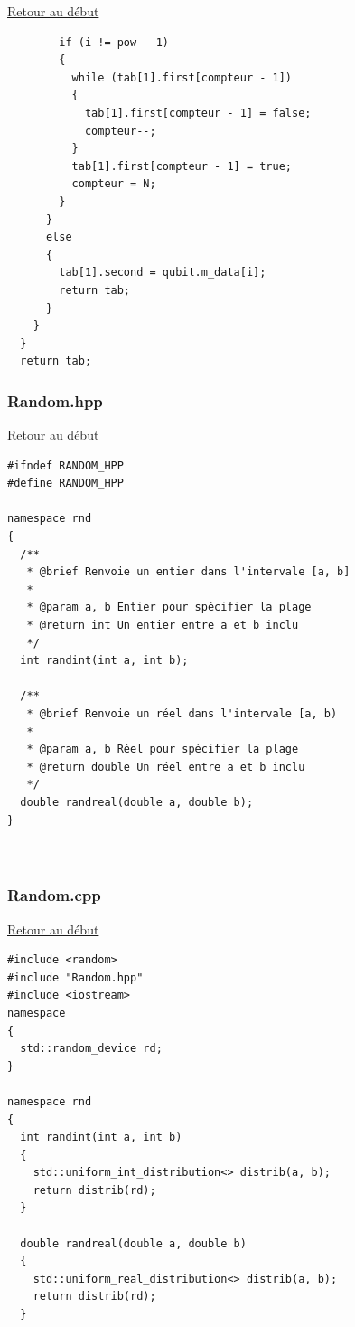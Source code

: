 {\begin{frame}[fragile]
\hyperlink{conclusion}{Retour au début}\newline
\begin{verbatim}
        if (i != pow - 1)
        {
          while (tab[1].first[compteur - 1])
          {
            tab[1].first[compteur - 1] = false;
            compteur--;
          }
          tab[1].first[compteur - 1] = true;
          compteur = N;
        }
      }
      else
      {
        tab[1].second = qubit.m_data[i];
        return tab;
      }
    }
  }
  return tab;

\end{verbatim}
\end{frame}

\begin{frame}[fragile]
\label{Random.hpp}
\frametitle{Random.hpp}
\hyperlink{conclusion}{Retour au début}\newline
\begin{verbatim}
#ifndef RANDOM_HPP
#define RANDOM_HPP

namespace rnd
{
  /**
   * @brief Renvoie un entier dans l'intervale [a, b]
   * 
   * @param a, b Entier pour spécifier la plage
   * @return int Un entier entre a et b inclu
   */
  int randint(int a, int b);

  /**
   * @brief Renvoie un réel dans l'intervale [a, b)
   * 
   * @param a, b Réel pour spécifier la plage
   * @return double Un réel entre a et b inclu
   */
  double randreal(double a, double b);
}



\end{verbatim}
\end{frame}

\begin{frame}[fragile]
\label{Random.cpp}
\frametitle{Random.cpp}
\hyperlink{conclusion}{Retour au début}\newline
\begin{verbatim}
#include <random>
#include "Random.hpp"
#include <iostream>
namespace
{
  std::random_device rd;
}

namespace rnd
{
  int randint(int a, int b)
  {
    std::uniform_int_distribution<> distrib(a, b);
    return distrib(rd);
  }

  double randreal(double a, double b)
  {
    std::uniform_real_distribution<> distrib(a, b);
    return distrib(rd);
  }


\end{verbatim}
\end{frame}}
